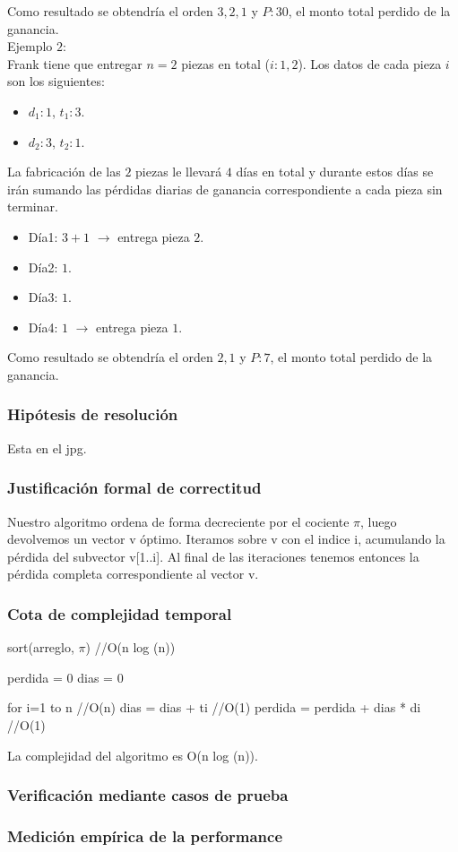 \documentclass[11pt, a4paper, twoside]{article}
\begin{document}
Como resultado se obtendr\'ia el orden $3,2,1$ y $P:30$, el monto total perdido de la ganancia. \\

Ejemplo $2$: \\

Frank tiene que entregar $n=2$ piezas en total ($i:1,2$). Los datos de cada pieza $i$ son los siguientes: 

\begin{itemize}
\item $d_1:1$, $t_1:3$. 
\item $d_2:3$, $t_2:1$. 
\end{itemize}  
    
La fabricaci\'on de las $2$ piezas le llevar\'a $4$ d\'ias en total y durante estos d\'ias se ir\'an sumando las p\'erdidas diarias de ganancia correspondiente a cada pieza sin terminar. 

\begin{itemize}
\item D\'ia1: $3+1$ $\rightarrow$ entrega pieza $2$. 
\item D\'ia2: $1$. 
\item D\'ia3: $1$.
\item D\'ia4: $1$ $\rightarrow$ entrega pieza $1$.
\end{itemize}  	
	
Como resultado se obtendr\'ia el orden $2,1$ y $P:7$, el monto total perdido de la ganancia. 

\subsubsection{Hipótesis de resolución}
Esta en el jpg.
\subsubsection{Justificación formal de correctitud}
Nuestro algoritmo ordena de forma decreciente por el cociente $\pi$, luego devolvemos un vector v \'optimo. Iteramos sobre v con el indice i, acumulando la p\'erdida del subvector v[1..i]. Al final de las iteraciones tenemos entonces la p\'erdida completa correspondiente al vector v.
\subsubsection{Cota de complejidad temporal}
sort(arreglo, $\pi$) //O(n log (n))

perdida = 0
dias = 0

for i=1 to n    //O(n)
    dias = dias + ti    //O(1)
    perdida = perdida + dias * di   //O(1)

La complejidad del algoritmo es O(n log (n)).


\subsubsection{Verificación mediante casos de prueba}

\subsubsection{Medición empírica de la performance}

\end{document}

